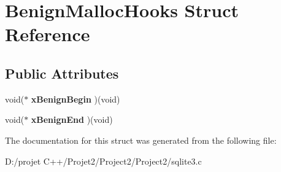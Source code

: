 \hypertarget{struct_benign_malloc_hooks}{}\section{Benign\+Malloc\+Hooks Struct Reference}
\label{struct_benign_malloc_hooks}
\subsection*{Public Attributes}
\begin{DoxyCompactItemize}
\item 
\mbox{\label{struct_benign_malloc_hooks_a2dd0ec63ed03ce338473f1005ccb022b}} 
void($\ast$ {\bfseries x\+Benign\+Begin} )(void)
\item 
\mbox{\label{struct_benign_malloc_hooks_a6ce62017925fa99ffbb34a0ad51f2c6c}} 
void($\ast$ {\bfseries x\+Benign\+End} )(void)
\end{DoxyCompactItemize}


The documentation for this struct was generated from the following file\+:\begin{DoxyCompactItemize}
\item 
D\+:/projet C++/\+Projet2/\+Project2/\+Project2/sqlite3.\+c\end{DoxyCompactItemize}

